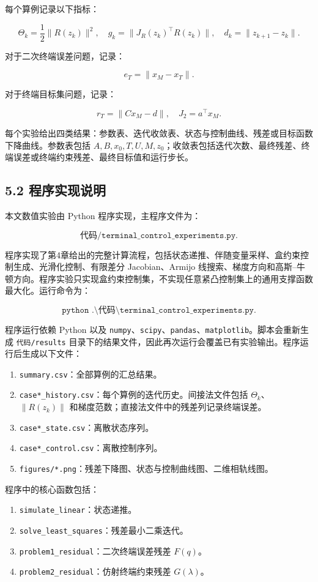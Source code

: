\documentclass[UTF8,a4paper,zihao=-4]{ctexart}
\begin{document}
每个算例记录以下指标：

\[
\Theta_k=\frac{1}{2}\|R(z_k)\|^2,\quad
g_k=\|J_R(z_k)^\top R(z_k)\|,\quad
d_k=\|z_{k+1}-z_k\|.
\]

对于二次终端误差问题，记录：

\[
e_T=\|x_M-x_T\|.
\]

对于终端目标集问题，记录：

\[
r_T=\|Cx_M-d\|,\quad J_2=a^\top x_M.
\]

每个实验给出四类结果：参数表、迭代收敛表、状态与控制曲线、残差或目标函数下降曲线。参数表包括 $A,B,x_0,T,U,M,z_0$；收敛表包括迭代次数、最终残差、终端误差或终端约束残差、最终目标值和运行步长。

\subsection{5.2 程序实现说明}

本文数值实验由 Python 程序实现，主程序文件为：

\[
\texttt{代码/terminal\_control\_experiments.py}.
\]

程序实现了第4章给出的完整计算流程，包括状态递推、伴随变量采样、盒约束控制生成、光滑化控制、有限差分 Jacobian、Armijo 线搜索、梯度方向和高斯--牛顿方向。程序实验只实现盒约束控制集，不实现任意紧凸控制集上的通用支撑函数最大化。运行命令为：

\[
\texttt{python .\textbackslash 代码\textbackslash terminal\_control\_experiments.py}.
\]

程序运行依赖 Python 以及 \texttt{numpy}、\texttt{scipy}、\texttt{pandas}、\texttt{matplotlib}。脚本会重新生成 \texttt{代码/results} 目录下的结果文件，因此再次运行会覆盖已有实验输出。程序运行后生成以下文件：

\begin{enumerate}
\item \texttt{summary.csv}：全部算例的汇总结果。
\item \texttt{case*\_history.csv}：每个算例的迭代历史。间接法文件包括 $\Theta_k$、$\|R(z_k)\|$ 和梯度范数；直接法文件中的残差列记录终端误差。
\item \texttt{case*\_state.csv}：离散状态序列。
\item \texttt{case*\_control.csv}：离散控制序列。
\item \texttt{figures/*.png}：残差下降图、状态与控制曲线图、二维相轨线图。
\end{enumerate}

程序中的核心函数包括：

\begin{enumerate}
\item \texttt{simulate\_linear}：状态递推。
\item \texttt{solve\_least\_squares}：残差最小二乘迭代。
\item \texttt{problem1\_residual}：二次终端误差残差 $F(q)$。
\item \texttt{problem2\_residual}：仿射终端约束残差 $G(\lambda)$。
\end{enumerate}
\end{document}
